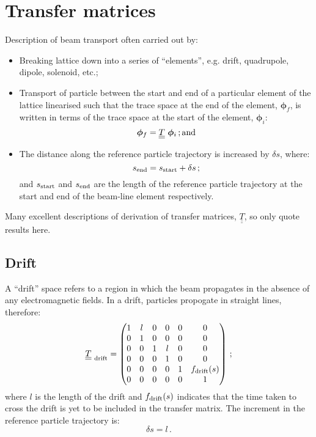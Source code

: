 \graphicspath{ {04-TransferMatrices/Figures/} }

\section{Transfer matrices}

Description of beam transport often carried out by:
\begin{itemize}
  \item Breaking lattice down into a series of ``elements'',
    e.g. drift, quadrupole, dipole, solenoid, etc.;
  \item Transport of particle between the start and end of a
    particular element of the lattice linearised such that the trace
    space at the end of the element, $\bm{\phi}_f$, is written in
    terms of the trace space at the start of the element,
    $\bm{\phi}_i$:
    \begin{equation}
      \bm{\phi}_f = \underline{\underline{T}} ~ \bm{\phi}_i \,
      {\rm ; and}
    \end{equation}
  \item The distance along the reference particle trajectory is
    increased by $\delta s$, where:
    \begin{equation}
      s_{\rm end} = s_{\rm start} + \delta s \, ;
    \end{equation}
    and $s_{\rm start}$ and $s_{\rm end}$ are the length of the
    reference particle trajectory at the start and end of the 
    beam-line element respectively.
\end{itemize}
Many excellent descriptions of derivation of transfer matrices,
$\underline{\underline{T}}$, so only quote results here.

\subsection{Drift}

A ``drift'' space refers to a region in which the beam propagates in
the absence of any electromagnetic fields.
In a drift, particles propogate in straight lines, therefore:
\begin{equation}
  \underline{\underline{T}}_{\rm~drift} =
        \begin{pmatrix}
          1 & l & 0 & 0 &              0 & 0 \\
          0 & 1 & 0 & 0 &              0 & 0 \\
          0 & 0 & 1 & l &              0 & 0 \\
          0 & 0 & 0 & 1 &              0 & 0 \\
          0 & 0 & 0 & 0 & 1 & f_{\rm drift}(s) \\
          0 & 0 & 0 & 0 &              0 & 1
        \end{pmatrix} \, ; 
\end{equation}
where $l$ is the length of the drift and $f_{\rm drift}(s)$ indicates
that the time taken to cross the drift is yet to be included in the
transfer matrix.
The increment in the reference particle trajectory is:
\begin{equation}
  \delta s = l \, .
\end{equation}
